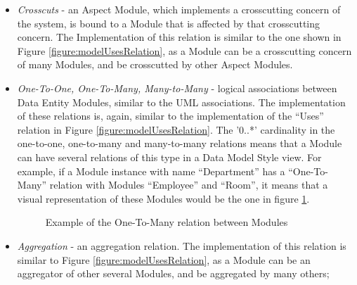 \begin{itemize}
\item \textit{Crosscuts} - an Aspect Module, which implements a crosscutting concern of the system, is bound to a Module that is affected by that crosscutting concern. The Implementation of this relation is similar to the one shown in Figure \ref{figure:modelUsesRelation}, as a Module can be a crosscutting concern of many Modules, and be crosscutted by other Aspect Modules.

\item \textit{One-To-One, One-To-Many, Many-to-Many} - logical associations between Data Entity Modules, similar to the UML associations. The implementation of these relations is, again, similar to the implementation of the ``Uses'' relation in Figure \ref{figure:modelUsesRelation}. The '0..*' cardinality in the one-to-one, one-to-many and many-to-many relations means that a Module can have several relations of this type in a Data Model Style view. For example, if a Module instance with name ``Department'' has a ``One-To-Many'' relation with Modules ``Employee'' and ``Room'', it means that a visual representation of these Modules would be the one in figure \ref{figure:modelOneToManyExample}.
\begin{figure}[h]
\centering
\renewcommand {\umltextcolor}{black}
\renewcommand {\umlfillcolor}{none}
\renewcommand {\umldrawcolor}{black}
\caption{Example of the One-To-Many relation between Modules}
\label{figure:modelOneToManyExample}
\end{figure}

\item \textit{Aggregation} - an aggregation relation. The implementation of this relation is similar to Figure \ref{figure:modelUsesRelation}, as a Module can be an aggregator of other several Modules, and be aggregated by many others;
\end{itemize}

